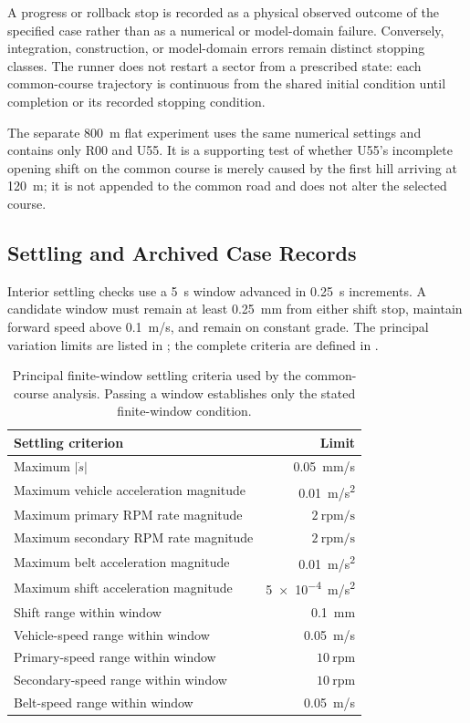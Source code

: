 \documentclass[11pt]{report}
\numberwithin{equation}{section}
\begin{document}
A progress or rollback stop is recorded as a physical observed outcome of the
specified case rather than as a numerical or model-domain failure. Conversely,
integration, construction, or model-domain errors remain distinct stopping
classes. The runner does not restart a sector from a prescribed state: each
common-course trajectory is continuous from the shared initial condition until
completion or its recorded stopping condition.

The separate \SI{800}{m} flat experiment uses the same numerical settings and
contains only R00 and U55. It is a supporting test of whether U55's incomplete
opening shift on the common course is merely caused by the first hill arriving
at \SI{120}{m}; it is not appended to the common road and does not alter the
selected course.

\subsection{Settling and Archived Case Records}
\label{app:course_reporting}

Interior settling checks use a \SI{5}{s} window advanced in
\SI{0.25}{s} increments. A candidate window must remain at least
\SI{0.25}{mm} from either shift stop, maintain forward speed above
\SI{0.1}{m/s}, and remain on constant grade. The principal variation limits
are listed in ; the complete criteria are
defined in
.

\begin{table}[H]
\centering
\small
\begin{tabular}{@{}p{}r@{}}
\toprule
Settling criterion & Limit \\
\midrule
Maximum \(\lvert\dot s\rvert\) & \SI{0.05}{mm/s} \\
Maximum vehicle acceleration magnitude & \SI{0.01}{m/s^2} \\
Maximum primary RPM rate magnitude & \(2~\mathrm{rpm/s}\) \\
Maximum secondary RPM rate magnitude & \(2~\mathrm{rpm/s}\) \\
Maximum belt acceleration magnitude & \SI{0.01}{m/s^2} \\
Maximum shift acceleration magnitude & \SI{5e-4}{m/s^2} \\
Shift range within window & \SI{0.1}{mm} \\
Vehicle-speed range within window & \SI{0.05}{m/s} \\
Primary-speed range within window & \(10~\mathrm{rpm}\) \\
Secondary-speed range within window & \(10~\mathrm{rpm}\) \\
Belt-speed range within window & \SI{0.05}{m/s} \\
\bottomrule
\end{tabular}
\caption{Principal finite-window settling criteria used by the common-course
analysis. Passing a window establishes only the stated finite-window
condition.}
\label{tab:course_settling_criteria}
\end{table}
\end{document}
